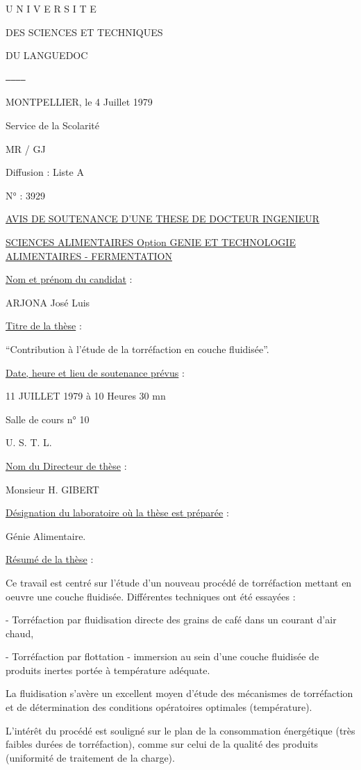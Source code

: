 U N I V E R S I T E

DES SCIENCES ET TECHNIQUES

DU LANGUEDOC

\texttt{------------}

MONTPELLIER, le 4 Juillet 1979

Service de la Scolarité

MR / GJ

Diffusion : Liste A

N° : 3929

\uline{AVIS DE SOUTENANCE D'UNE THESE DE DOCTEUR INGENIEUR}

\uline{SCIENCES ALIMENTAIRES Option GENIE ET TECHNOLOGIE ALIMENTAIRES - FERMENTATION}

\uline{Nom et prénom du candidat} :

ARJONA José Luis

\uline{Titre de la thèse} :

``Contribution à l'étude de la torréfaction en couche fluidisée''.

\uline{Date, heure et lieu de soutenance prévus} :

11 JUILLET 1979 à 10 Heures 30 mn

Salle de cours n° 10

U. S. T. L.

\uline{Nom du Directeur de thèse} :

Monsieur H. GIBERT

\uline{Désignation du laboratoire où la thèse est préparée} :

Génie Alimentaire.

\uline{Résumé de la thèse} :

Ce travail est centré sur l'étude d'un nouveau procédé de torréfaction mettant en oeuvre une couche fluidisée. Différentes techniques ont été essayées :

- Torréfaction par fluidisation directe des grains de café dans un courant d'air chaud,

- Torréfaction par flottation - immersion au sein d'une couche fluidisée de produits inertes portée à température adéquate.

La fluidisation s'avère un excellent moyen d'étude des mécanismes de torréfaction et de détermination des conditions opératoires optimales (température).

L'intérêt du procédé est souligné sur le plan de la consommation énergétique (très faibles durées de torréfaction), comme sur celui de la qualité des produits (uniformité de traitement de la charge).

